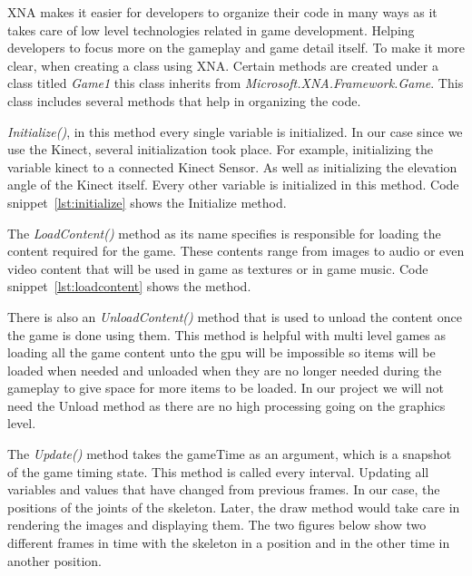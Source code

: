 XNA makes it easier for developers to organize their code in many ways as it takes care of low level technologies related in game development. Helping developers to focus more on the gameplay and game detail itself. To make it more clear, when creating a class using XNA. Certain methods are created under a class titled \emph{Game1} this class inherits from \emph{Microsoft.XNA.Framework.Game}. This class includes several methods that help in organizing the code.

\emph{Initialize()}, in this method every single variable is initialized. In our case since we use the Kinect, several initialization took place. For example, initializing the variable kinect to a connected Kinect Sensor. As well as initializing the elevation angle of the Kinect itself. Every other variable is initialized in this method. Code snippet~\ref{lst:initialize} shows the Initialize method.



The \emph{LoadContent()} method as its name specifies is responsible for loading the content required for the game. These contents range from images to audio or even video content that will be used in game as textures or in game music. Code snippet~\ref{lst:loadcontent} shows the method.



There is also an \emph{UnloadContent()} method that is used to unload the content once the game is done using them. This method is helpful with multi level games as loading all the game content unto the gpu will be impossible so items will be loaded when needed and unloaded when they are no longer needed during the gameplay to give space for more items to be loaded. In our project we will not need the Unload method as there are no high processing going on the graphics level.

The \emph{Update()} method takes the gameTime as an argument, which is a snapshot of the game timing state. This method is called every interval. Updating all variables and values that have changed from previous frames. In our case, the positions of the joints of the skeleton. Later, the draw method would take care in rendering the images and displaying them. The two figures below show two different frames in time with the skeleton in a position and in the other time in another position.

